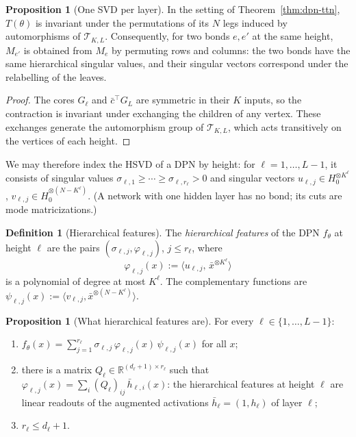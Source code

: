 \documentclass[11pt]{article}
\newcommand{\R}{\mathbb{R}}
\newcommand{\ip}[2]{\langle #1,#2\rangle}
\newcommand{\xb}{\bar{x}}
\newcommand{\hb}{\bar{h}}
\newcommand{\cb}{\bar{c}}
\theoremstyle{definition}
\newtheorem{proposition}[theorem]{Proposition}
\newtheorem{definition}[theorem]{Definition}
\numberwithin{equation}{section}
\begin{document}
\begin{proposition}[One SVD per layer]\label{prop:per-layer}
In the setting of Theorem~\ref{thm:dpn-ttn}, $T(\theta)$ is invariant under the permutations of its $N$ legs induced by automorphisms of $\mathcal T_{K,L}$. Consequently, for two bonds $e,e'$ at the same height, $M_{e'}$ is obtained from $M_e$ by permuting rows and columns: the two bonds have the same hierarchical singular values, and their singular vectors correspond under the relabelling of the leaves.
\end{proposition}

\begin{proof}
The cores $G_\ell$ and $\cb^\top G_L$ are symmetric in their $K$ inputs, so the contraction is invariant under exchanging the children of any vertex. These exchanges generate the automorphism group of $\mathcal T_{K,L}$, which acts transitively on the vertices of each height.
\end{proof}

We may therefore index the HSVD of a DPN by height: for $\ell=1,\dots,L-1$, it consists of singular values $\sigma_{\ell,1}\ge\cdots\ge\sigma_{\ell,r_\ell}>0$ and singular vectors $u_{\ell,j}\in H_0^{\otimes K^\ell}$, $v_{\ell,j}\in H_0^{\otimes(N-K^\ell)}$. (A network with one hidden layer has no bond; its cuts are mode matricizations.)

\begin{definition}[Hierarchical features]\label{def:features}
The \emph{hierarchical features} of the DPN $f_\theta$ at height $\ell$ are the pairs $(\sigma_{\ell,j},\varphi_{\ell,j})$, $j\le r_\ell$, where
\[
\varphi_{\ell,j}(x):=\big\langle u_{\ell,j},\,\xb^{\otimes K^\ell}\big\rangle
\]
is a polynomial of degree at most $K^\ell$. The complementary functions are $\psi_{\ell,j}(x):=\ip{v_{\ell,j}}{\xb^{\otimes(N-K^\ell)}}$.
\end{definition}

\begin{proposition}[What hierarchical features are]\label{prop:features}
For every $\ell\in\{1,\dots,L-1\}$:
\begin{enumerate}[label=(\roman*),nosep]
\item $f_\theta(x)=\sum_{j=1}^{r_\ell}\sigma_{\ell,j}\,\varphi_{\ell,j}(x)\,\psi_{\ell,j}(x)$ for all $x$;
\item there is a matrix $Q_\ell\in\R^{(d_\ell+1)\times r_\ell}$ such that $\varphi_{\ell,j}(x)=\sum_i(Q_\ell)_{ij}\,\hb_{\ell,i}(x)$: the hierarchical features at height $\ell$ are linear readouts of the augmented activations $\hb_\ell=(1,h_\ell)$ of layer $\ell$;
\item $r_\ell\le d_\ell+1$.
\end{enumerate}
\end{proposition}
\end{document}
